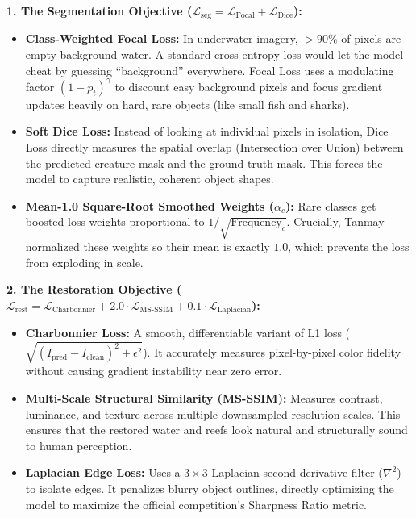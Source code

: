 \documentclass[10pt,a4paper]{article}
\begin{document}
\noindent\textbf{1. The Segmentation Objective ($\mathcal{L}_{\text{seg}} = \mathcal{L}_{\text{Focal}} + \mathcal{L}_{\text{Dice}}$):}
\begin{itemize}[noitemsep,topsep=1pt]
    \item \textbf{Class-Weighted Focal Loss:} In underwater imagery, $>90\%$ of pixels are empty background water. A standard cross-entropy loss would let the model cheat by guessing ``background'' everywhere. Focal Loss uses a modulating factor $(1 - p_t)^\gamma$ to discount easy background pixels and focus gradient updates heavily on hard, rare objects (like small fish and sharks).
    \item \textbf{Soft Dice Loss:} Instead of looking at individual pixels in isolation, Dice Loss directly measures the spatial overlap (Intersection over Union) between the predicted creature mask and the ground-truth mask. This forces the model to capture realistic, coherent object shapes.
    \item \textbf{Mean-1.0 Square-Root Smoothed Weights ($\alpha_c$):} Rare classes get boosted loss weights proportional to $1 / \sqrt{\text{Frequency}_c}$. Crucially, Tanmay normalized these weights so their mean is exactly $1.0$, which prevents the loss from exploding in scale.
\end{itemize}

\noindent\textbf{2. The Restoration Objective ($\mathcal{L}_{\text{rest}} = \mathcal{L}_{\text{Charbonnier}} + 2.0 \cdot \mathcal{L}_{\text{MS-SSIM}} + 0.1 \cdot \mathcal{L}_{\text{Laplacian}}$):}
\begin{itemize}[noitemsep,topsep=1pt]
    \item \textbf{Charbonnier Loss:} A smooth, differentiable variant of L1 loss ($\sqrt{(I_{\text{pred}} - I_{\text{clean}})^2 + \epsilon^2}$). It accurately measures pixel-by-pixel color fidelity without causing gradient instability near zero error.
    \item \textbf{Multi-Scale Structural Similarity (MS-SSIM):} Measures contrast, luminance, and texture across multiple downsampled resolution scales. This ensures that the restored water and reefs look natural and structurally sound to human perception.
    \item \textbf{Laplacian Edge Loss:} Uses a $3 \times 3$ Laplacian second-derivative filter ($\nabla^2$) to isolate edges. It penalizes blurry object outlines, directly optimizing the model to maximize the official competition's Sharpness Ratio metric.
\end{itemize}
\end{document}
